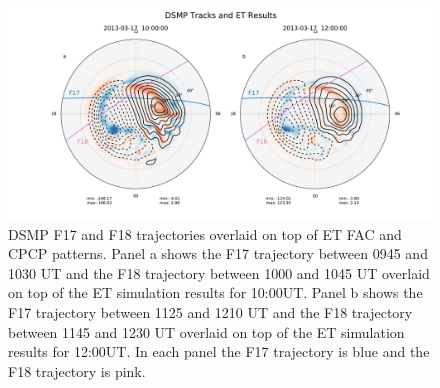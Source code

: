 \documentclass[draft,jgrga]{agutex}
\begin{document}
\begin{article}
 \begin{figure}[t]
\noindent\includegraphics[width=39pc]{JGR-DMSPTraj.pdf}
\caption{\label{dmsptraj-fig}
DSMP F17 and F18 trajectories overlaid on top of ET FAC and CPCP patterns.  Panel a shows the F17 trajectory between 0945 and 1030 UT and the F18 trajectory between 1000 and 1045 UT overlaid on top of the ET simulation results for 10:00UT.   Panel b shows the F17 trajectory between 1125 and 1210 UT and the F18 trajectory between 1145 and 1230 UT overlaid on top of the ET simulation results for 12:00UT.  In each panel the F17 trajectory is blue and the F18 trajectory is pink.}
\end{figure}


\end{article}
\end{document}
